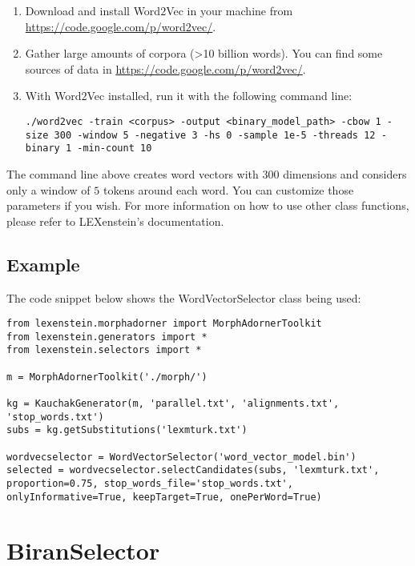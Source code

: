 \begin{enumerate}
\item Download and install Word$2$Vec in your machine from \url{https://code.google.com/p/word2vec/}.
\item Gather large amounts of corpora (>10 billion words). You can find some sources of data in \url{https://code.google.com/p/word2vec/}.
\item With Word$2$Vec installed, run it with the following command line:

\begin{lstlisting}
./word2vec -train <corpus> -output <binary_model_path> -cbow 1 -size 300 -window 5 -negative 3 -hs 0 -sample 1e-5 -threads 12 -binary 1 -min-count 10
\end{lstlisting}
\end{enumerate}

The command line above creates word vectors with $300$ dimensions and considers only a window of $5$ tokens around each word. You can customize those parameters if you wish. For more information on how to use other class functions, please refer to LEXenstein's documentation.

\subsection{Example}

The code snippet below shows the WordVectorSelector class being used:

\begin{lstlisting}
from lexenstein.morphadorner import MorphAdornerToolkit
from lexenstein.generators import *
from lexenstein.selectors import *

m = MorphAdornerToolkit('./morph/')

kg = KauchakGenerator(m, 'parallel.txt', 'alignments.txt', 'stop_words.txt')
subs = kg.getSubstitutions('lexmturk.txt')

wordvecselector = WordVectorSelector('word_vector_model.bin')
selected = wordvecselector.selectCandidates(subs, 'lexmturk.txt', proportion=0.75, stop_words_file='stop_words.txt', onlyInformative=True, keepTarget=True, onePerWord=True)
\end{lstlisting}









\section{BiranSelector}

